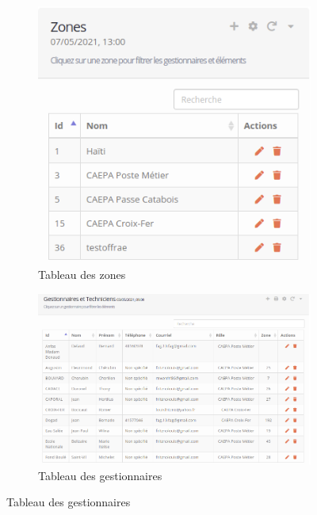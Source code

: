 \documentclass{EPL-master-thesis-covers-FR}
\begin{document}
				
				\begin{figure}[H]
					\begin{subfigure}[b]{0.3\textwidth}
  						\includegraphics[width=1\linewidth]{images/gestion_tab1}
  						\caption{Tableau des zones}
					\end{subfigure}%
					\begin{subfigure}[b]{0.7\textwidth}
  						\includegraphics[width=1\linewidth]{images/gestion_tab2}
  						\caption{Tableau des gestionnaires}
					\end{subfigure}
				\end{figure}
			
\end{document}
